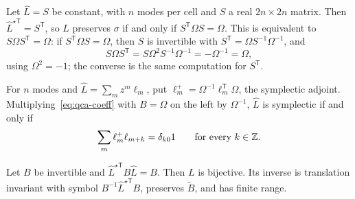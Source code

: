 \noindent{}

\begin{example}\label{ex:qca-onsite}
Let $\hat L=S$ be constant, with $n$ modes per cell and $S$ a real $2n\times2n$ matrix. Then
$\hat L^{\star\mathsf T}=S^{\mathsf T}$, so $L$ preserves $\sigma$ if and only if
$S^{\mathsf T}\Omega S=\Omega$. This is equivalent to $S\Omega S^{\mathsf T}=\Omega$: if
$S^{\mathsf T}\Omega S=\Omega$, then $S$ is invertible with $S^{\mathsf T}=\Omega S^{-1}\Omega^{-1}$,
and
\[S\Omega S^{\mathsf T}=S\Omega^2S^{-1}\Omega^{-1}=-\Omega^{-1}=\Omega,\]
using $\Omega^2=-1$; the converse is the same computation for $S^{\mathsf T}$.
\end{example}

\noindent{}

\begin{example}\label{ex:qca-coeff}
For $n$ modes  and $\hat L=\sum_mz^m\ell_m$, put $\ell_m^+=\Omega^{-1}\ell_m^{\mathsf T}\Omega$, the
symplectic adjoint. Multiplying~\eqref{eq:qca-coeff} with $B=\Omega$ on the left by $\Omega^{-1}$,
$\hat L$ is symplectic if and only if
\[\sum_m\ell_m^+\ell_{m+k}=\delta_{k0}1\qquad\text{for every }k\in\mathbb Z.\]
\end{example}

\begin{theorem}[Inverse]\label{thm:qca-inverse}
Let $B$ be invertible and $\hat L^{\star\mathsf T}B\hat L=B$. Then $L$ is bijective. Its inverse
is translation invariant with symbol $B^{-1}\hat L^{\star\mathsf T}B$, preserves $\tilde B$, and
has finite range.
\end{theorem}

